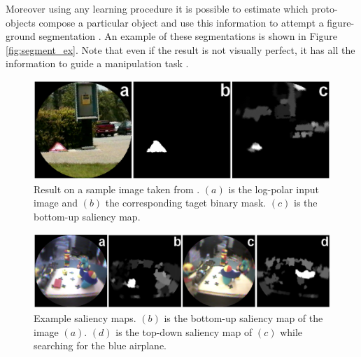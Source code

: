\documentclass{llncs}
\begin{document}
Moreover using any learning procedure it is possible to estimate which
proto-objects compose a particular object and use this information to attempt
a figure-ground segmentation \cite{Orabona07}. An example of these
segmentations is shown in Figure \ref{fig:segment_ex}. Note that even if the
result is not visually perfect, it has all the information to guide a
manipulation task \cite{NataleOBMS05}.

\begin{figure}[t]
  \begin{center}
    \includegraphics[width=0.67\linewidth]{./figs/attention/itti_numbers}
    \caption{Result on a sample image taken from \cite{IttiK01b}.
     $(a)$ is the log-polar input image and $(b)$ the corresponding taget binary mask.
     $(c)$ is the bottom-up saliency map.}
    \label{fig:itti_ex}
  \end{center}
\end{figure}

\begin{figure}[t]
  \begin{center}
    \includegraphics[width=0.9\linewidth]{./figs/attention/a6}
    \caption{Example saliency maps. $(b)$ is the 
     bottom-up saliency map of the image $(a)$. $(d)$ is the top-down
	   saliency map of $(c)$ while searching for the blue airplane.}
    \label{fig:out_ex}
  \end{center}
\end{figure}
\end{document}
